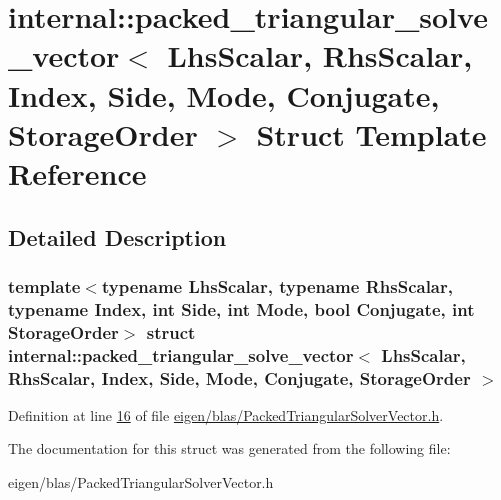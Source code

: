 \hypertarget{structinternal_1_1packed__triangular__solve__vector}{}\section{internal\+:\+:packed\+\_\+triangular\+\_\+solve\+\_\+vector$<$ Lhs\+Scalar, Rhs\+Scalar, Index, Side, Mode, Conjugate, Storage\+Order $>$ Struct Template Reference}
\label{structinternal_1_1packed__triangular__solve__vector}


\subsection{Detailed Description}
\subsubsection*{template$<$typename Lhs\+Scalar, typename Rhs\+Scalar, typename Index, int Side, int Mode, bool Conjugate, int Storage\+Order$>$\newline
struct internal\+::packed\+\_\+triangular\+\_\+solve\+\_\+vector$<$ Lhs\+Scalar, Rhs\+Scalar, Index, Side, Mode, Conjugate, Storage\+Order $>$}



Definition at line \hyperlink{eigen_2blas_2_packed_triangular_solver_vector_8h_source_l00016}{16} of file \hyperlink{eigen_2blas_2_packed_triangular_solver_vector_8h_source}{eigen/blas/\+Packed\+Triangular\+Solver\+Vector.\+h}.



The documentation for this struct was generated from the following file\+:\begin{DoxyCompactItemize}
\item 
eigen/blas/\+Packed\+Triangular\+Solver\+Vector.\+h\end{DoxyCompactItemize}
